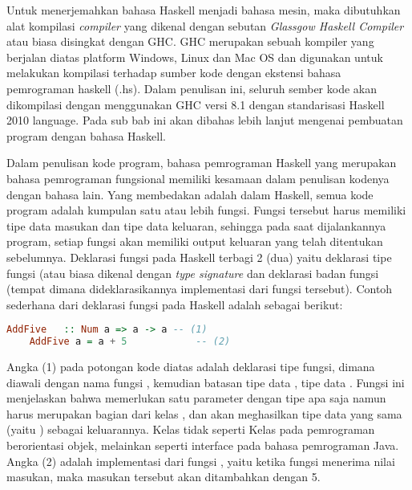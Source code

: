 \documentclass[pi.tex]{subfile}
\begin{document}
Untuk menerjemahkan bahasa Haskell menjadi bahasa mesin, maka dibutuhkan alat kompilasi \emph{compiler} yang dikenal dengan sebutan \emph{Glassgow Haskell Compiler} atau biasa disingkat dengan GHC. GHC merupakan sebuah kompiler yang berjalan diatas platform Windows, Linux dan Mac OS dan digunakan untuk melakukan kompilasi terhadap sumber kode dengan ekstensi bahasa pemrograman haskell (.hs). Dalam penulisan ini, seluruh sember kode akan dikompilasi dengan menggunakan GHC versi 8.1 dengan standarisasi Haskell 2010 language. Pada sub bab ini akan dibahas lebih lanjut mengenai pembuatan program dengan bahasa Haskell.

Dalam penulisan kode program, bahasa pemrograman Haskell yang merupakan bahasa pemrograman fungsional memiliki kesamaan dalam penulisan kodenya dengan bahasa lain. Yang membedakan adalah dalam Haskell, semua kode program adalah kumpulan satu atau lebih fungsi. Fungsi tersebut harus memiliki tipe data masukan dan tipe data keluaran, sehingga pada saat dijalankannya program, setiap fungsi akan memiliki output keluaran yang telah ditentukan sebelumnya. Deklarasi fungsi pada Haskell terbagi 2 (dua) yaitu deklarasi tipe fungsi (atau biasa dikenal dengan \emph{type signature} dan deklarasi badan fungsi (tempat dimana dideklarasikannya implementasi dari fungsi tersebut). Contoh sederhana dari deklarasi fungsi pada Haskell adalah sebagai berikut:\\

  \begin{lstlisting}[language=Haskell]
    AddFive   :: Num a => a -> a -- (1)
    AddFive a = a + 5            -- (2)
  \end{lstlisting}
  
  Angka (1) pada potongan kode diatas adalah deklarasi tipe fungsi, dimana diawali dengan nama fungsi , kemudian batasan tipe data , tipe data . Fungsi ini menjelaskan bahwa  memerlukan satu parameter dengan tipe apa saja namun harus merupakan bagian dari kelas , dan akan meghasilkan tipe data yang sama (yaitu ) sebagai keluarannya. Kelas  tidak seperti Kelas pada pemrograman berorientasi objek, melainkan seperti interface pada bahasa pemrograman Java.
  Angka (2) adalah implementasi dari fungsi , yaitu ketika fungsi menerima nilai masukan, maka masukan tersebut akan ditambahkan dengan 5.
\end{document}
